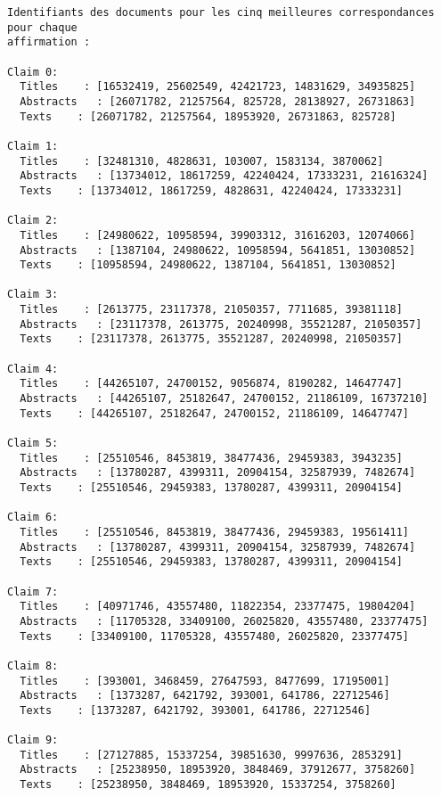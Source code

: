 \documentclass[11pt]{article}
\begin{document}
    \begin{Verbatim}[commandchars=\\\{\}]
Identifiants des documents pour les cinq meilleures correspondances pour chaque
affirmation :

Claim 0:
  Titles    : [16532419, 25602549, 42421723, 14831629, 34935825]
  Abstracts   : [26071782, 21257564, 825728, 28138927, 26731863]
  Texts    : [26071782, 21257564, 18953920, 26731863, 825728]

Claim 1:
  Titles    : [32481310, 4828631, 103007, 1583134, 3870062]
  Abstracts   : [13734012, 18617259, 42240424, 17333231, 21616324]
  Texts    : [13734012, 18617259, 4828631, 42240424, 17333231]

Claim 2:
  Titles    : [24980622, 10958594, 39903312, 31616203, 12074066]
  Abstracts   : [1387104, 24980622, 10958594, 5641851, 13030852]
  Texts    : [10958594, 24980622, 1387104, 5641851, 13030852]

Claim 3:
  Titles    : [2613775, 23117378, 21050357, 7711685, 39381118]
  Abstracts   : [23117378, 2613775, 20240998, 35521287, 21050357]
  Texts    : [23117378, 2613775, 35521287, 20240998, 21050357]

Claim 4:
  Titles    : [44265107, 24700152, 9056874, 8190282, 14647747]
  Abstracts   : [44265107, 25182647, 24700152, 21186109, 16737210]
  Texts    : [44265107, 25182647, 24700152, 21186109, 14647747]

Claim 5:
  Titles    : [25510546, 8453819, 38477436, 29459383, 3943235]
  Abstracts   : [13780287, 4399311, 20904154, 32587939, 7482674]
  Texts    : [25510546, 29459383, 13780287, 4399311, 20904154]

Claim 6:
  Titles    : [25510546, 8453819, 38477436, 29459383, 19561411]
  Abstracts   : [13780287, 4399311, 20904154, 32587939, 7482674]
  Texts    : [25510546, 29459383, 13780287, 4399311, 20904154]

Claim 7:
  Titles    : [40971746, 43557480, 11822354, 23377475, 19804204]
  Abstracts   : [11705328, 33409100, 26025820, 43557480, 23377475]
  Texts    : [33409100, 11705328, 43557480, 26025820, 23377475]

Claim 8:
  Titles    : [393001, 3468459, 27647593, 8477699, 17195001]
  Abstracts   : [1373287, 6421792, 393001, 641786, 22712546]
  Texts    : [1373287, 6421792, 393001, 641786, 22712546]

Claim 9:
  Titles    : [27127885, 15337254, 39851630, 9997636, 2853291]
  Abstracts   : [25238950, 18953920, 3848469, 37912677, 3758260]
  Texts    : [25238950, 3848469, 18953920, 15337254, 3758260]


\end{Verbatim}
\end{document}
